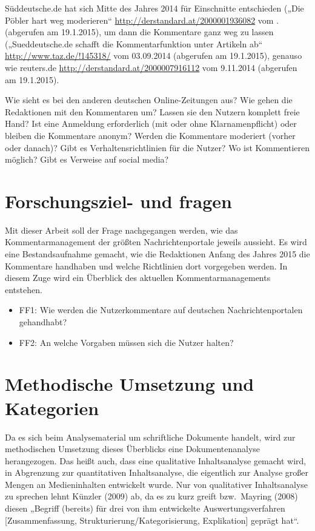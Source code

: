 Süddeutsche.de hat sich Mitte des Jahres 2014 für Einschnitte entschieden („Die Pöbler hart weg moderieren“ 
\url{http://derstandard.at/2000001936082} vom . (abgerufen am 19.1.2015), um dann die Kommentare ganz weg zu lassen („Sueddeutsche.de schafft die Kommentarfunktion unter Artikeln ab“ \url{http://www.taz.de/!145318/} vom
03.09.2014 (abgerufen am 19.1.2015), genauso wie reuters.de \url{http://derstandard.at/2000007916112} vom 9.11.2014 (abgerufen am 19.1.2015).



Wie sieht es bei den anderen deutschen Online-Zeitungen aus? Wie gehen die
Redaktionen mit den Kommentaren um? Lassen sie den Nutzern komplett freie Hand?
Ist eine Anmeldung erforderlich (mit oder ohne Klarnamenpflicht) oder bleiben
die Kommentare anonym? Werden die Kommentare moderiert (vorher oder danach)?
Gibt es Verhaltensrichtlinien für die Nutzer? Wo ist Kommentieren möglich? Gibt
es Verweise auf social media?






\section{Forschungsziel- und fragen}

Mit dieser Arbeit soll der Frage nachgegangen werden, wie das Kommentarmanagement
der größten Nachrichtenportale jeweils aussieht. Es wird eine Bestandsaufnahme
gemacht, wie die Redaktionen Anfang des Jahres 2015 die Kommentare handhaben und
welche Richtlinien dort vorgegeben werden. In diesem Zuge wird ein Überblick des
aktuellen Kommentarmanagements entstehen.

\begin{itemize} \em
  \item FF1: Wie werden die Nutzerkommentare auf deutschen Nachrichtenportalen gehandhabt?
  \item FF2: An welche Vorgaben müssen sich die Nutzer halten?
\end{itemize}


\section{Methodische Umsetzung und Kategorien}

Da es sich beim Analysematerial um schriftliche Dokumente handelt, wird zur
methodischen Umsetzung dieses Überblicks eine Dokumentenanalyse herangezogen. 
Das heißt auch, dass eine qualitative
Inhaltsanalyse gemacht wird, in Abgrenzung zur quantitativen Inhaltsanalyse, die
eigentlich zur Analyse großer Mengen an Medieninhalten entwickelt
wurde. Nur von qualitativer Inhaltsanalyse zu sprechen lehnt Künzler (2009) ab, da es
zu kurz greift bzw.~Mayring (2008) diesen „Begriff (bereits) für drei von ihm
entwickelte Auswertungsverfahren [Zusammenfassung,
Strukturierung/Kategorisierung, Explikation] geprägt hat“.

